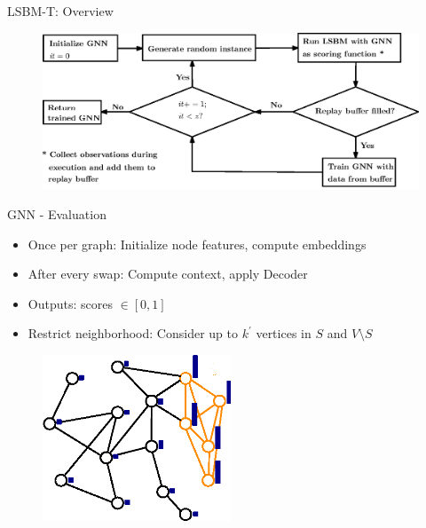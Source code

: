 \documentclass{beamer}
\begin{document}
\begin{frame}{LSBM-T: Overview}
    \begin{figure}
        \centering
        \includegraphics[width=\textwidth]{graphics/flowchart.eps}
    \end{figure}
\end{frame}

\begin{frame}{GNN - Evaluation}
    \begin{itemize}
        \item<1-> Once per graph: Initialize node features, compute embeddings
        \item<2-> After every swap: Compute context, apply Decoder
        \item<3-> Outputs: scores $\in [0,1]$
        \item<4-> Restrict neighborhood: Consider up to $k^\prime$ vertices in $S$ and $V \setminus S$
    \end{itemize}
    \begin{figure}
        \centering
        \includegraphics[width=0.5\textwidth]{graphics/algorithm_poster_5.eps}
    \end{figure}
\end{frame}
\end{document}
